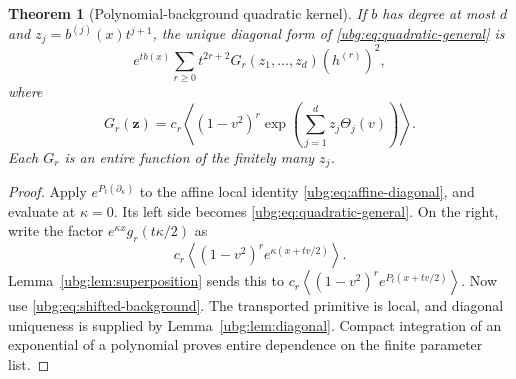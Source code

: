 \documentclass[11pt,letterpaper]{article}
\numberwithin{equation}{section}
\newtheorem{theorem}{Theorem}[section]
\theoremstyle{definition}\newtheorem{definition}[theorem]{Definition}
\theoremstyle{remark}\newtheorem{remark}[theorem]{Remark}
\newcommand{\av}[1]{\left\langle #1\right\rangle}
\begin{document}
\begin{theorem}[Polynomial-background quadratic kernel]
\label{ubg:thm:transport}
If $b$ has degree at most $d$ and $z_j=b^{(j)}(x)t^{j+1}$, the unique
diagonal form of \eqref{ubg:eq:quadratic-general} is
\begin{equation}\label{ubg:eq:general-diagonal}
 e^{tb(x)}\sum_{r\ge0}t^{2r+2}
       G_r(z_1,\ldots,z_d)(h^{(r)})^2,
\end{equation}
where
\begin{equation}\label{ubg:eq:Gr}
 \boxed{\displaystyle
 G_r(\boldsymbol z)=c_r\av{(1-v^2)^r
                    \exp\left(\sum_{j=1}^d z_j\Theta_j(v)\right)}.}
\end{equation}
Each $G_r$ is an entire function of the finitely many $z_j$.
\end{theorem}
\begin{proof}
Apply $e^{P_t(\partial_\kappa)}$ to the affine local identity
\eqref{ubg:eq:affine-diagonal}, and evaluate at $\kappa=0$.
Its left side becomes \eqref{ubg:eq:quadratic-general}.
On the right, write the factor $e^{\kappa x}g_r(t\kappa/2)$ as
\[
 c_r\av{(1-v^2)^r e^{\kappa(x+tv/2)}}.
\]
Lemma~\ref{ubg:lem:superposition} sends this to
$c_r\av{(1-v^2)^r e^{P_t(x+tv/2)}}$.
Now use \eqref{ubg:eq:shifted-background}.
The transported primitive is local, and diagonal uniqueness is supplied
by Lemma~\ref{ubg:lem:diagonal}. Compact integration of an exponential
of a polynomial proves entire dependence on the finite parameter list.
\end{proof}
\end{document}
